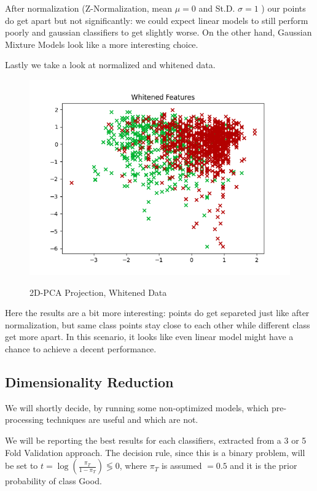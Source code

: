 \documentclass[twocolumn]{article}
\begin{document}
After normalization (Z-Normalization, mean $\mu = 0$ and St.D. $\sigma = 1$ ) our points do get apart but not significantly: we could expect linear models to still perform poorly and gaussian classifiers to get slightly worse. On the other hand, Gaussian Mixture Models look like a more interesting choice.

Lastly we take a look at normalized and whitened data.

\begin{figure}[H]
    \caption{2D-PCA Projection, Whitened Data}
    {\includegraphics[width=\linewidth]{2DWhitened.png}}
    \label{2DWHI}
\end{figure}

Here the results are a bit more interesting: points do get separeted just like after normalization, but same class points stay close to each other while different class get more apart. In this scenario, it looks like even linear model might have a chance to achieve a decent performance.

\subsection{Dimensionality Reduction}

We will shortly decide, by running some non-optimized models, which pre-processing techniques are useful and which are not. 

We will be reporting the best results for each classifiers, extracted from a 3 or 5 Fold Validation approach. The decision rule, since this is a binary problem, will be set to $\displaystyle t = \log(\frac{\pi_T}{1-\pi_T}) \lessgtr 0 $, where $\pi_T$ is assumed $ = 0.5$ and it is the prior probability of class Good.
\end{document}
